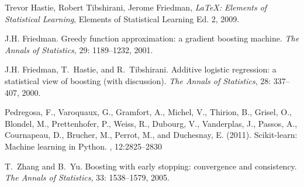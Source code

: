 \documentclass[twoside,12pt]{article}
\begin{document}

\begin{thebibliography}{9}

  Trevor Hastie, Robert Tibshirani, Jerome Friedman,
  \emph{\LaTeX: Elements of Statistical Learning},
  Elements of Statistical Learning Ed. 2,
  2009.

	J.H. Friedman.
	\newblock Greedy function approximation: a gradient boosting machine.
	\newblock \emph{The Annals of Statistics}, 29: 1189--1232, 2001.

	J.H. Friedman, T.~Hastie, and R.~Tibshirani.
	\newblock Additive logistic regression: a statistical view of boosting (with discussion).
	\newblock \emph{The Annals of Statistics}, 28: 337--407, 2000.

 Pedregosa, F., Varoquaux, G., Gramfort, A., Michel, V., Thirion, B., Grisel,
    O., Blondel, M., Prettenhofer, P., Weiss, R., Dubourg, V., Vanderplas, J.,
    Passos, A., Cournapeau, D., Brucher, M., Perrot, M., and Duchesnay, E.
    (2011).
 \newblock Scikit-learn: Machine learning in {P}ython.
 , 12:2825--2830 

	T.~Zhang and B.~Yu.
	\newblock Boosting with early stopping: convergence and consistency.
	\newblock \emph{The Annals of Statistics}, 33: 1538--1579, 2005.

\end{thebibliography}
\end{document}
